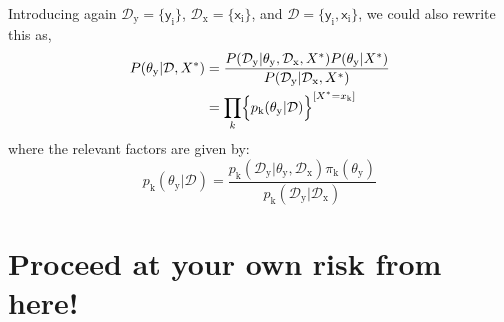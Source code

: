 \documentclass[]{report}
\begin{document}
Introducing again $\mathcal{D}_\mathrm{y} = \{ \mathsf{y}_\mathrm{i} \} $, $\mathcal{D}_\mathrm{x} = \{ \mathsf{x}_\mathrm{i} \} $, and $\mathcal{D} = \{ \mathsf{y}_\mathrm{i}, \mathsf{x}_\mathrm{i} \} $, we could also rewrite this as,
\begin{align}
P( \theta_\mathrm{y} | \mathcal{D}, X^* ) 
&=
\frac
	{
		P( \mathcal{D}_\mathrm{y} | \theta_\mathrm{y}, \mathcal{D}_\mathrm{x}, X^*)
		P( \theta_\mathrm{y} | X^* )
	}
	{
		P( \mathcal{D}_\mathrm{y}| \mathcal{D}_\mathrm{x}, X^* )
	}
\nonumber \\
&=
\prod_{k}
	\Bigl\{
		p_\mathrm{k}( \theta_\mathrm{y} | \mathcal{D} )
	\Bigr\}^{
		[ X^* = x_\mathrm{k} ]
	}
\end{align}
where the relevant factors are given by:
\begin{equation}
p_\mathrm{k}( \theta_\mathrm{y} | \mathcal{D} ) 
=
\frac
	{
		p_\mathrm{k}( \mathcal{D}_\mathrm{y} |
			\theta_\mathrm{y}, \mathcal{D}_\mathrm{x}
		)
		\pi_\mathrm{k}( \theta_\mathrm{y} )
	}
	{
		p_\mathrm{k}( \mathcal{D}_\mathrm{y} | \mathcal{D}_\mathrm{x} )
	}
\end{equation}

\section*{Proceed at your own risk from here!}
\end{document}
